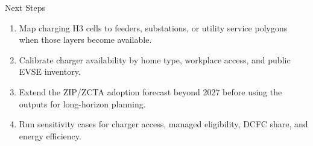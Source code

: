 \documentclass[aspectratio=169]{beamer}
\begin{document}
\begin{frame}{Next Steps}
\small
\begin{enumerate}
  \item Map charging H3 cells to feeders, substations, or utility service polygons when those layers become available.
  \item Calibrate charger availability by home type, workplace access, and public EVSE inventory.
  \item Extend the ZIP/ZCTA adoption forecast beyond 2027 before using the outputs for long-horizon planning.
  \item Run sensitivity cases for charger access, managed eligibility, DCFC share, and energy efficiency.
\end{enumerate}
\end{frame}
\end{document}

